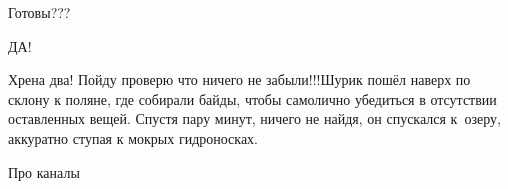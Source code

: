 \mdash Готовы???

\mdash ДА!

\mdash Хрена два! Пойду проверю что ничего не забыли!!!\mdash Шурик пошёл наверх по склону к поляне, где собирали байды, чтобы самолично убедиться в отсутствии оставленных вещей. Спустя пару минут, ничего не найдя, он спускался к~озеру, аккуратно ступая к мокрых гидроносках.


Про каналы

\begin{center}
\end{center}
